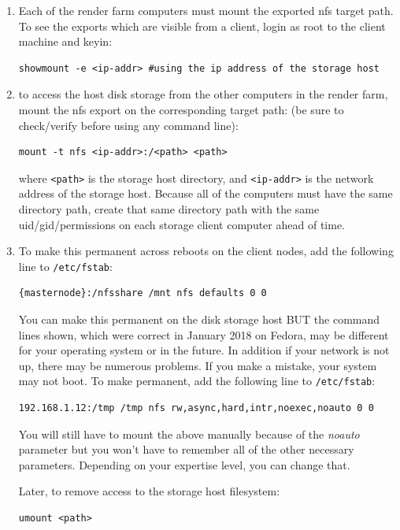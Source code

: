 \begin{description}
\begin{enumerate}
\begin{lstlisting}[style=sh]
systemctl restart nfs
\end{lstlisting}
  \item Each of the render farm computers must mount the exported
    nfs target path.  To see the exports which are visible from a
    client, login as root to the client machine and keyin:
\begin{lstlisting}[style=sh]
showmount -e <ip-addr> #using the ip address of the storage host
\end{lstlisting}
  \item to access the host disk storage from the other computers in
    the render farm, mount the nfs export on the corresponding target
    path: (be sure to check/verify before using any command line):
\begin{lstlisting}[style=sh]
mount -t nfs <ip-addr>:/<path> <path>
\end{lstlisting} where \texttt{<path>} is the storage host
    directory, and \texttt{<ip-addr>} is the network address of the
    storage host.  Because all of the computers must have the same
    directory path, create that same directory path with the same
    uid/gid/permissions on each storage client computer ahead of time.
  \item To make this permanent across reboots on the client nodes,
    add the following line to \texttt{/etc/fstab}:
\begin{lstlisting}[style=sh]
{masternode}:/nfsshare /mnt nfs defaults 0 0
\end{lstlisting} You can make this permanent on the disk storage
    host BUT the command lines shown, which were correct in January 2018
    on Fedora, may be different for your operating system or in the
    future.  In addition if your network is not up, there may be
    numerous problems.  If you make a mistake, your system may not boot.
    To make permanent, add the following line to \texttt{/etc/fstab}:
\begin{lstlisting}[style=sh]
192.168.1.12:/tmp /tmp nfs rw,async,hard,intr,noexec,noauto 0 0
\end{lstlisting} You will still have to mount the above manually
    because of the \textit{noauto} parameter but you won’t have to
    remember all of the other necessary parameters.  Depending on your
    expertise level, you can change that.

    Later, to remove access to the storage host filesystem:
\begin{lstlisting}[style=sh]
umount <path>
\end{lstlisting}


\end{enumerate}
\end{description}
